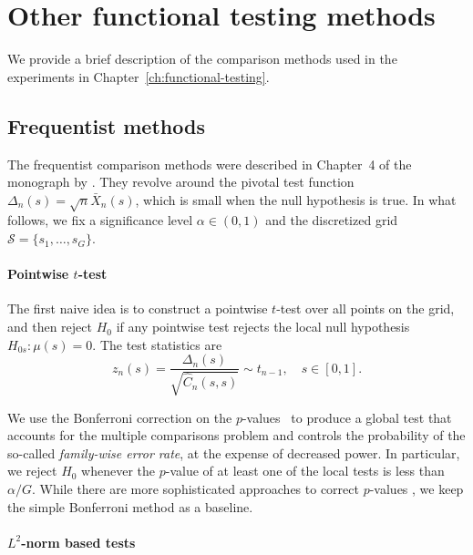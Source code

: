\chapter{Other functional testing methods}\label{app:comparison-test}

We provide a brief description of the comparison methods used in the experiments in Chapter~\ref{ch:functional-testing}. 

\section{Frequentist methods}

The frequentist comparison methods were described in Chapter~4 of the monograph by \citet{zhang2013analysis}. They revolve around the pivotal test function \(\Delta_n(s) = \sqrt{n}\bar X_n(s)\), which is small when the null hypothesis is true. In what follows, we fix a significance level \(\alpha\in (0,1)\) and the discretized grid \(\mathcal S=\{s_1,\dots,s_G\}\).

\subsubsection*{Pointwise \(t\)-test}

The first naive idea is to construct a pointwise \(t\)-test over all points on the grid, and then reject \(H_0\) if any pointwise test rejects the local null hypothesis \(H_{0s}: \mu(s)=0\). The test statistics are
\[
z_n(s) = \frac{\Delta_n(s)}{\sqrt{\hat C_n(s,s)}} \sim t_{n-1},\quad s\in[0,1].
\]

We use the Bonferroni correction on the \(p\)-values~\citep{shaffer1995multiple} to produce a global test that accounts for the multiple comparisons problem and controls the probability of the so-called \textit{family-wise error rate}, at the expense of decreased power. In particular, we reject \(H_0\) whenever the \(p\)-value of at least one of the local tests is less than \(\alpha/G\). While there are more sophisticated approaches to correct \(p\)-values \citep[e.g.][]{cox2008pointwise}, we keep the simple Bonferroni method as a baseline.

\subsubsection*{\(L^2\)-norm based tests}


